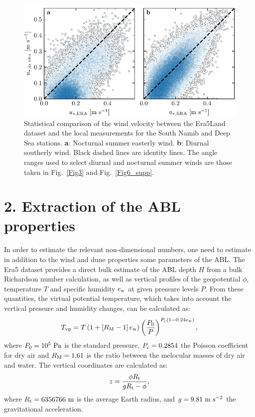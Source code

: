 \begin{figure}
  \centering
  \includegraphics[scale=1]{Figures/Figure8_supp.pdf}
  \caption{Statistical comparison of the wind velocity between the Era5Land dataset and the local measurements for the South Namib and Deep Sea stations. \textbf{a}: Nocturnal summer easterly wind. \textbf{b}: Diurnal southerly wind. Black dashed lines are identity lines. The angle ranges used to select diurnal and nocturnal summer winds are those taken in Fig.~\ref{Fig3} and Fig.~\ref{Fig6_supp}.}
  \label{Fig8_supp}
\end{figure}

\section*{2. Extraction of the ABL properties}

In order to estimate the relevant non-dimensional numbers, one need to estimate in addition to the wind and dune properties some parameters of the ABL. The Era5 dataset provides a direct bulk estimate of the ABL depth $H$ from a bulk Richardson number calculation, as well as vertical profiles of the geopotential $\phi$, temperature $T$ and specific humidity $e_{\textup{w}}$ at given pressure levels $P$. From these quantities, the virtual potential temperature, which takes into account the vertical pressure and humidity changes, can be calculated as:
\begin{equation}
  T_{\textup{vp}} = T\left(1 + \left[R_{\textup{M}} - 1\right]e_{\textup{w}}\right)\left(\frac{P_{0}}{P}\right)^{P_{\textup{c}}(1 - 0.24e_{\textup{w}})},
\end{equation}
where $P_{0} = 10^{5}~\textup{Pa}$ is the standard pressure, $P_{\textup{c}} = 0.2854$ the Poisson coefficient for dry air and $R_{\textup{M}}=1.61$ is the ratio between the melocular masses of dry air and water. The vertical coordinates are calculated as:
\begin{equation}
  z = \frac{\phi R_{\textup{t}}}{g R_{\textup{t}} - \phi},
\end{equation}
where $R_{\textup{t}} = 6356766~\textup{m}$ is the average Earth radius, and $g = 9.81~\textup{m}~\textup{s}^{-2}$ the gravitational acceleration.

